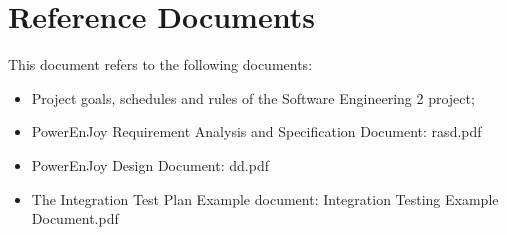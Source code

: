 \section{Reference Documents}
This document refers to the following documents:
\begin{itemize}
\item Project goals, schedules and rules of the Software Engineering 2 project;
\item PowerEnJoy Requirement Analysis and Specification Document: rasd.pdf 
\item PowerEnJoy Design Document: dd.pdf 
\item The Integration Test Plan Example document: Integration Testing Example Document.pdf
\end{itemize}